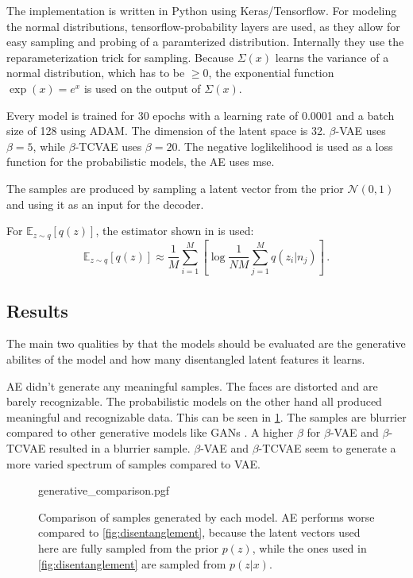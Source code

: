 \documentclass[a4paper]{IEEEtran}
\begin{document}
{The implementation is written in Python using Keras/Tensorflow. For modeling the normal distributions, tensorflow-probability layers are used, as they allow for easy sampling and probing of a paramterized distribution. Internally they use the reparameterization trick for sampling. Because $\Sigma(x)$ learns the variance of a normal distribution, which has to be $\geq 0$, the exponential function $\exp(x) = e^x$ is used on the output of $\Sigma(x)$.

Every model is trained for 30 epochs with a learning rate of 0.0001 and a batch size of 128 using ADAM\cite{DBLP:journals/corr/KingmaB14}. The dimension of the latent space is 32. $\beta$-VAE uses $\beta = 5$, while $\beta$-TCVAE uses $\beta = 20$. The negative loglikelihood is used as a loss function for the probabilistic models, the AE uses mse.

The samples are produced by sampling a latent vector from the prior $\mathcal{N}(0,1)$ and using it as an input for the decoder.

For $\mathbb{E}_{z \sim q}\left[ q(z) \right]$, the estimator shown in \cite{chen2019isolating} is used:
\begin{equation}
	\mathbb{E}_{z \sim q} \left[ q(z) \right] \approx \frac{1}{M} \sum_{i = 1}^{M} \left[ \log \frac{1}{NM} \sum_{j = 1}^{M}q(z_i|n_j) \right]\,.
\end{equation}

\subsection{Results}
The main two qualities by that the models should be evaluated are the generative abilites of the model and how many disentangled latent features it learns.

AE didn't generate any meaningful samples. The faces are distorted and are barely recognizable. The probabilistic models on the other hand all produced meaningful and recognizable data. This can be seen in \ref{fig:generative}. The samples are blurrier compared to other generative models like GANs \cite{goodfellow2014generative}. A higher $\beta$ for $\beta$-VAE and $\beta$-TCVAE resulted in a blurrier sample. $\beta$-VAE and $\beta$-TCVAE seem to generate a more varied spectrum of samples compared to VAE.

\begin{figure}
	\centering
    {generative_comparison.pgf}
    \caption{Comparison of samples generated by each model. AE performs worse compared to \ref{fig:disentanglement}, because the latent vectors used here are fully sampled from the prior $p(z)$, while the ones used in \ref{fig:disentanglement} are sampled from $p(z|x)$.}
    \label{fig:generative}
\end{figure}

}
\end{document}
